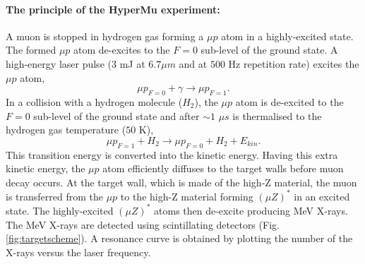 \documentclass[12pt]{article}
\begin{document}
\paragraph{The principle of the HyperMu experiment:}
A muon is stopped in hydrogen gas forming a ${\mu}p$ atom in a highly-excited state. The formed ${\mu}p$ atom de-excites to the $F=0$ sub-level of the ground state. A high-energy laser pulse ($3$ mJ at $6.7 {\mu}m$ and at $500$ Hz repetition rate) excites the ${\mu}p$ atom,
\begin{equation*}
{\mu}p_{F=0} + {\gamma} \rightarrow {\mu}p_{F=1}.
\end{equation*}
In a collision with a hydrogen molecule ($H_2$), the $\mu{p}$ atom is de-excited to the $F=0$ sub-level of the ground state and after $\sim{1}$ ${\mu}s$ is thermalised to the hydrogen gas temperature ($50$ K),
\begin{equation*}
{\mu}p_{F=1} + H_2 \rightarrow {\mu}p_{F=0} + H_2 + E_{kin}.
\end{equation*}
This transition energy is converted into the kinetic energy. Having this extra kinetic energy, the ${\mu}p$ atom efficiently diffuses to the target walls before muon decay occurs. At the target wall, which is made of the high-Z material, the muon is transferred from the $\mu{p}$ to the high-Z material forming $({\mu}Z)^{*}$ in an excited state. The highly-excited $({\mu}Z)^{*}$ atoms then de-excite producing MeV X-rays. The MeV X-rays are detected using scintillating detectors (Fig. \ref{fig:targetscheme}). A resonance curve is obtained by plotting the number of the X-rays versus the laser frequency. 
\end{document}
